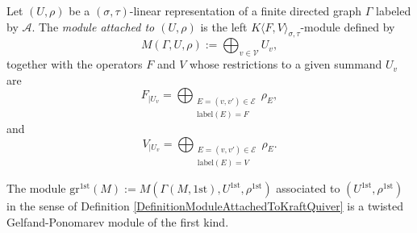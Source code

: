 \documentclass[10pt,a4paper]{amsart}
\begin{document}
\begin{definition}\label{DefinitionModuleAttachedToKraftQuiver}
    Let $(U,\rho)$ be a $(\sigma,\tau)$-linear representation of a finite directed graph $\Gamma$ labeled by $\mathcal A$. The \textit{module attached to $(U,\rho)$} is the left $K\langle F,V\rangle_{\sigma,\tau}$-module defined by 
    \begin{equation*}
        M(\Gamma,U,\rho) := \bigoplus_{v \in \mathcal V} U_v,
    \end{equation*}
    together with the operators $F$ and $V$ whose restrictions to a given summand $U_v$ are
    \begin{equation*}
        F_{|U_v} = \bigoplus_{\substack{E = (v,v') \in \mathcal E\\ \mathrm{label}(E)  = F}} \rho_E,
    \end{equation*}
    and 
    \begin{equation*}
        V_{|U_v} = \bigoplus_{\substack{E = (v,v') \in \mathcal E\\ \mathrm{label}(E)  = V}} \rho_E.
    \end{equation*}
\end{definition}

\begin{proposition}\label{Gr1stIsOfTheFirstKind}
    The module $\mathrm{gr}^{1\mathrm{st}}(M) := M(\Gamma(M,1\mathrm{st}),U^{1\mathrm{st}},\rho^{1\mathrm{st}})$ associated to $(U^{1\mathrm{st}},\rho^{1\mathrm{st}})$ in the sense of Definition \ref{DefinitionModuleAttachedToKraftQuiver} is a twisted Gelfand-Ponomarev module of the first kind.
\end{proposition}
\end{document}

